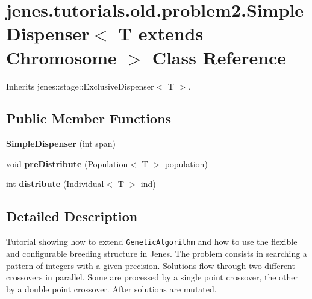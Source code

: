 \hypertarget{classjenes_1_1tutorials_1_1old_1_1problem2_1_1_simple_dispenser_3_01_t_01extends_01_chromosome_01_4}{
\section{jenes.tutorials.old.problem2.SimpleDispenser$<$ T extends Chromosome $>$ Class Reference}
\label{classjenes_1_1tutorials_1_1old_1_1problem2_1_1_simple_dispenser_3_01_t_01extends_01_chromosome_01_4}
}
Inherits jenes::stage::ExclusiveDispenser$<$ T $>$.

\subsection*{Public Member Functions}
\begin{CompactItemize}
\item 
\hypertarget{classjenes_1_1tutorials_1_1old_1_1problem2_1_1_simple_dispenser_3_01_t_01extends_01_chromosome_01_4_d9405ac409bd21e83c50f78472835da7}{
\textbf{SimpleDispenser} (int span)}
\label{classjenes_1_1tutorials_1_1old_1_1problem2_1_1_simple_dispenser_3_01_t_01extends_01_chromosome_01_4_d9405ac409bd21e83c50f78472835da7}

\item 
\hypertarget{classjenes_1_1tutorials_1_1old_1_1problem2_1_1_simple_dispenser_3_01_t_01extends_01_chromosome_01_4_428636fd68143e1c24ea22bf626c290b}{
void \textbf{preDistribute} (Population$<$ T $>$ population)}
\label{classjenes_1_1tutorials_1_1old_1_1problem2_1_1_simple_dispenser_3_01_t_01extends_01_chromosome_01_4_428636fd68143e1c24ea22bf626c290b}

\item 
\hypertarget{classjenes_1_1tutorials_1_1old_1_1problem2_1_1_simple_dispenser_3_01_t_01extends_01_chromosome_01_4_593230e918223c099f243524d3496783}{
int \textbf{distribute} (Individual$<$ T $>$ ind)}
\label{classjenes_1_1tutorials_1_1old_1_1problem2_1_1_simple_dispenser_3_01_t_01extends_01_chromosome_01_4_593230e918223c099f243524d3496783}

\end{CompactItemize}


\subsection{Detailed Description}
Tutorial showing how to extend {\tt GeneticAlgorithm} and how to use the flexible and configurable breeding structure in Jenes. The problem consists in searching a pattern of integers with a given precision. Solutions flow through two different crossovers in parallel. Some are processed by a single point crossover, the other by a double point crossover. After solutions are mutated.

